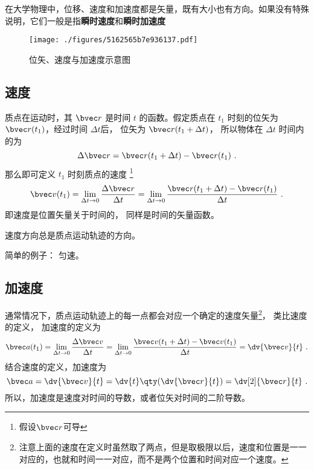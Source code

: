 

在大学物理中，位移、速度和加速度都是矢量，既有大小也有方向。如果没有特殊说明，它们一般是指\textbf{瞬时速度}和\textbf{瞬时加速度}

\begin{figure}[ht]
\centering
\texttt{[image: ./figures/5162565b7e936137.pdf]}
\caption{位矢、速度与加速度示意图} \label{fig_VnA_1}
\end{figure}

\subsection{速度}

质点在运动时，其 $\bvec r$ 是时间 $t$ 的函数。假定质点在 $t_1$ 时刻的位矢为 $\bvec r(t_1)$，经过时间 $\Delta t$后， 位矢为 $\bvec r(t_1 + \Delta t)$， 所以物体在 $\Delta t$ 时间内的为
\begin{equation}
\Delta \bvec r = \bvec r (t_1 + \Delta t) - \bvec r (t_1)~.
\end{equation}
那么即可定义 $t_1$ 时刻质点的速度
\footnote{假设$\bvec r$可导}
\begin{equation}
\bvec v(t_1) = \lim_{\Delta t \to 0} \frac{\Delta \bvec r}{\Delta t} = \lim_{\Delta t \to 0} \frac{\bvec r (t_1 + \Delta t) - \bvec r(t_1)}{\Delta t}~.
\end{equation}
即速度是位置矢量关于时间的， 同样是时间的矢量函数。

\begin{theorem}{}
速度方向总是质点运动轨迹的方向。
\end{theorem}

简单的例子： 匀速。

\subsection{加速度}

通常情况下，质点运动轨迹上的每一点都会对应一个确定的速度矢量\footnote{注意上面的速度在定义时虽然取了两点，但是取极限以后，速度和位置是一一对应的，也就和时间一一对应，而不是两个位置和时间对应一个速度。}， 类比速度的定义， 加速度的定义为
\begin{equation}\label{eq_VnA_4}
\bvec a(t_1) = \lim_{\Delta t \to 0} \frac{\Delta \bvec v}{\Delta t}
= \lim_{\Delta t \to 0} \frac{\bvec v(t_1 + \Delta t) - \bvec v (t_1)}{\Delta t} = \dv{\bvec v}{t}~.
\end{equation}
结合速度的定义，加速度为
\begin{equation}
\bvec a = \dv{\bvec v}{t} = \dv{t} \qty( \dv{\bvec r}{t} ) = \dv[2]{\bvec r}{t}~.
\end{equation}
所以，加速度是速度对时间的导数，或者位矢对时间的二阶导数。

